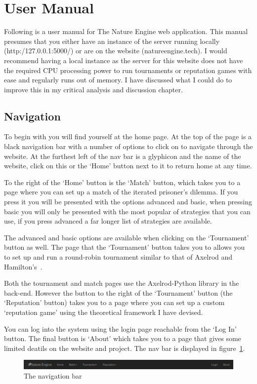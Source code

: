 \documentclass[]{final_report}
\begin{document}
\section{User Manual}
Following is a user manual for The Nature Engine web application. This manual presumes that you either have an instance of the server running locally (http:/127.0.0.1:5000/) or are on the website (natureengine.tech). I would recommend having a local instance as the server for this website does not have the required CPU processing power to run tournaments or reputation games with ease and regularly runs out of memory. I have discussed what I could do to improve this in my critical analysis and discussion chapter.

\subsection{Navigation}
To begin with you will find yourself at the home page. At the top of the page is a black navigation bar with a number of options to click on to navigate through the website. At the furthest left of the nav bar is a glyphicon and the name of the website, click on this or the `Home' button next to it to return home at any time.\par 
To the right of the `Home' button is the `Match' button, which takes you to a page where you can set up a match of the iterated prisoner's dilemma. If you press it you will be presented with the options advanced and basic, when pressing basic you will only be presented with the most popular of strategies that you can use, if you press advanced a far longer list of strategies are available.\par 
The advanced and basic options are available when clicking on the `Tournament' button as well. The page that the `Tournament' button takes you to allows you to set up and run a round-robin tournament similar to that of Axelrod and Hamilton's~\cite{evolution_of_cooperation}.\par 
Both the tournament and match pages use the Axelrod-Python library in the back-end. However the button to the right of the `Tournament' button (the `Reputation' button) takes you to a page where you can set up a custom `reputation game' using the theoretical framework I have devised.\par 
You can log into the system using the login page reachable from the `Log In' button. The final button is `About' which takes you to a page that gives some limited deatils on the website and project. The nav bar is displayed in figure~\ref{fig:navbar}.
\begin{figure}
	\includegraphics[width=\textwidth]{NavBar.png}
	\caption{The navigation bar}
	\label{fig:navbar}
\end{figure}
\end{document}
